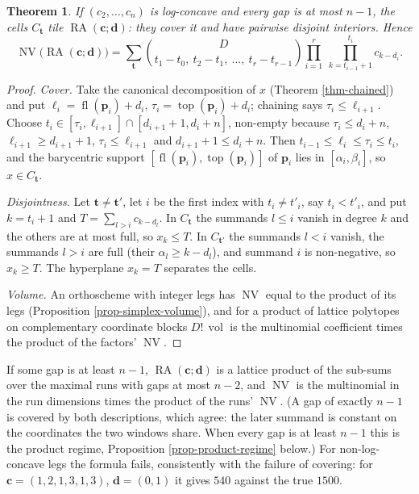 \documentclass[11pt, a4paper, abstract=yes]{scrartcl}
\theoremstyle{definition}
\theoremstyle{remark}
\theoremstyle{plain}
\newtheorem{theorem}[definition]{Theorem}
\newcommand{\vek}[1]{\boldsymbol{#1}}
\theoremstyle{remark}
\theoremstyle{plain}
\newcommand{\tp}{\operatorname{top}}
\newcommand{\RA}{\operatorname{RA}}
\newcommand{\NV}{\operatorname{NV}}
\newcommand{\vol}{\operatorname{vol}}
\newcommand{\fl}{\operatorname{fl}}
\newcommand{\leannone}{\tikz[baseline=-0.6ex]\draw[leannone,line width=0.6pt] (0,0) circle (0.55ex);}
\newcommand{\leanmark}[1]{\leavevmode{\reversemarginpar\marginnote{\raggedleft#1}}}
\begin{document}
\begin{theorem}
\leanmark{\leannone}If \((c_2,\dots,c_n)\) is log-concave and every gap is at most \(n-1\), the cells \(C_{\vek t}\)
tile \(\RA(\vek c;\vek d)\): they cover it and have pairwise disjoint interiors. Hence
\[
  \NV\bigl(\RA(\vek c;\vek d)\bigr)=\sum_{\vek t}\binom{D}{t_1-t_0,\ t_2-t_1,\ \dots,\ t_r-t_{r-1}}
  \prod_{i=1}^r\ \prod_{k=t_{i-1}+1}^{t_i}c_{k-d_i}.
\]
\label{thm-staircase}
\end{theorem}

\begin{proof}
\emph{Cover.} Take the canonical decomposition of \(x\) (Theorem \ref{thm-chained}) and put
\(\ell_i=\fl(\vek p_i)+d_i\), \(\tau_i=\tp(\vek p_i)+d_i\); chaining says
\(\tau_i\le\ell_{i+1}\). Choose \(t_i\in[\tau_i,\ell_{i+1}]\cap[d_{i+1}+1,d_i+n]\),
non-empty because \(\tau_i\le d_i+n\), \(\ell_{i+1}\ge d_{i+1}+1\), \(\tau_i\le\ell_{i+1}\)
and \(d_{i+1}+1\le d_i+n\). Then \(t_{i-1}\le\ell_i\le\tau_i\le t_i\), and the barycentric
support \([\fl(\vek p_i),\tp(\vek p_i)]\) of \(\vek p_i\) lies in \([\alpha_i,\beta_i]\), so
\(x\in C_{\vek t}\).

\emph{Disjointness.} Let \(\vek t\ne\vek t'\), let \(i\) be the first index with \(t_i\ne t'_i\), say
\(t_i<t'_i\), and put \(k=t_i+1\) and \(T=\sum_{l>i}c_{k-d_l}\). In \(C_{\vek t}\) the summands
\(l\le i\) vanish in degree \(k\) and the others are at most full, so \(x_k\le T\). In \(C_{\vek t'}\)
the summands \(l<i\) vanish, the summands \(l>i\) are full (their \(\alpha_l\ge k-d_l\)), and summand
\(i\) is non-negative, so \(x_k\ge T\). The hyperplane \(x_k=T\) separates the cells.

\emph{Volume.} An orthoscheme with integer legs has \(\NV\) equal to the product of its legs
(Proposition \ref{prop-simplex-volume}), and for a product of lattice polytopes on complementary
coordinate blocks \(D!\,\vol\) is the multinomial coefficient times the product of the factors'
\(\NV\).
\end{proof}

If some gap is at least \(n-1\), \(\RA(\vek c;\vek d)\) is a lattice product of the sub-sums over
the maximal runs with gaps at most \(n-2\), and \(\NV\) is the multinomial in the run dimensions
times the product of the runs' \(\NV\). (A gap of exactly \(n-1\) is covered by both descriptions,
which agree: the later summand is constant on the coordinates the two windows share. When every gap
is at least \(n-1\) this is the product regime, Proposition \ref{prop-product-regime} below.) For non-log-concave legs the formula fails, consistently
with the failure of covering: for \(\vek c=(1,2,1,3,1,3)\), \(\vek d=(0,1)\) it gives \(540\) against
the true \(1500\).
\end{document}
